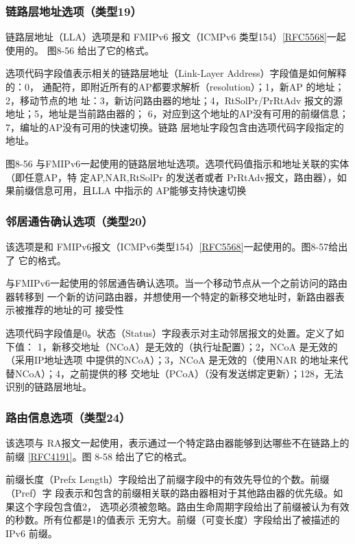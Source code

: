 \subsubsection{链路层地址选项（类型19）}
链路层地址（LLA）选项是和 FMIPv6 报文（ICMPv6 类型154）\href{https://www.rfc-editor.org/rfc/rfc5568}{[RFC5568]}一起使用的。
图8-56 给出了它的格式。

选项代码字段值表示相关的链路层地址（Link-Layer Address）字段值是如何解释的：0，
通配符，即附近所有的AP都要求解析（resolution）；1，新AP 的地址；2，移动节点的地
址：3，新访问路由器的地址；4，RtSolPr/PrRtAdv 报文的源地址；5，地址是当前路由器的；
6，对应到这个地址的AP没有可用的前缀信息；7，编址的AP没有可用的快速切换。链路
层地址字段包含由选项代码字段指定的地址。

图8-56 与FMIPv6一起使用的链路层地址选项。选项代码值指示和地址关联的实体（即任意AP，特
定AP,NAR,RtSolPr 的发送者或者 PrRtAdv报文，路由器），如果前缀信息可用，且LLA
中指示的 AP能够支持快速切换

\subsubsection{邻居通告确认选项（类型20）}
该选项是和 FMIPv6报文（ICMPv6类型154）\href{https://www.rfc-editor.org/rfc/rfc5568}{[RFC5568]}一起使用的。图8-57给出了
它的格式。

与FMIPv6一起使用的邻居通告确认选项。当一个移动节点从一个之前访问的路由器转移到
一个新的访问路由器，并想使用一个特定的新移交地址时，新路由器表示被推荐的地址的可
接受性

选项代码字段值是0。状态（Status）字段表示对主动邻居报文的处置。定义了如下值：
1，新移交地址（NCoA）是无效的（执行址配置）；2，NCoA 是无效的（采用IP地址选项
中提供的NCoA）；3，NCoA 是无效的（使用NAR 的地址来代替NCoA）；4，之前提供的移
交地址（PCoA）（没有发送绑定更新）；128，无法识别的链路层地址。

\subsubsection{路由信息选项（类型24）}
该选项与 RA报文一起使用，表示通过一个特定路由器能够到达哪些不在链路上的前缀
\href{https://www.rfc-editor.org/rfc/rfc4191}{[RFC4191]}。图 8-58 给出了它的格式。

前缀长度（Prefx Length）字段给出了前缀字段中的有效先导位的个数。前缀（Pref）字
段表示和包含的前缀相关联的路由器相对于其他路由器的优先级。如果这个字段包含值2，
选项必须被忽略。路由生命周期字段给出了前缀被认为有效的秒数。所有位都是1的值表示
无穷大。前缀（可变长度）字段给出了被描述的IPv6 前缀。

